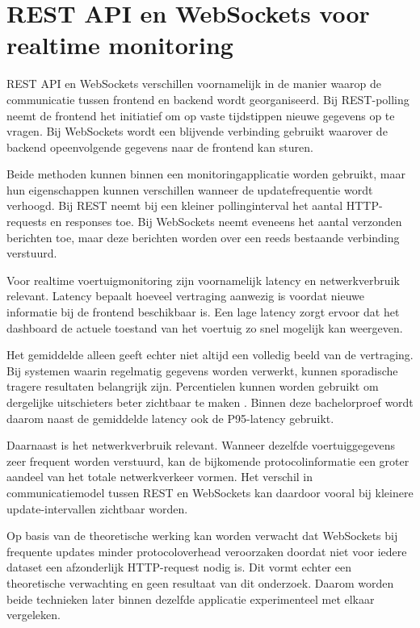 \section{REST API en WebSockets voor realtime monitoring}
REST API en WebSockets verschillen voornamelijk in de manier waarop de
communicatie tussen frontend en backend wordt georganiseerd. Bij REST-polling
neemt de frontend het initiatief om op vaste tijdstippen nieuwe gegevens op te
vragen. Bij WebSockets wordt een blijvende verbinding gebruikt waarover de
backend opeenvolgende gegevens naar de frontend kan sturen.

Beide methoden kunnen binnen een monitoringapplicatie worden gebruikt, maar hun
eigenschappen kunnen verschillen wanneer de updatefrequentie wordt verhoogd.
Bij REST neemt bij een kleiner pollinginterval het aantal HTTP-requests en
responses toe. Bij WebSockets neemt eveneens het aantal verzonden berichten
toe, maar deze berichten worden over een reeds bestaande verbinding
verstuurd.

Voor realtime voertuigmonitoring zijn voornamelijk latency en netwerkverbruik
relevant. Latency bepaalt hoeveel vertraging aanwezig is voordat nieuwe
informatie bij de frontend beschikbaar is. Een lage latency zorgt ervoor dat
het dashboard de actuele toestand van het voertuig zo snel mogelijk kan
weergeven.

Het gemiddelde alleen geeft echter niet altijd een volledig beeld van de
vertraging. Bij systemen waarin regelmatig gegevens worden verwerkt, kunnen
sporadische tragere resultaten belangrijk zijn. Percentielen kunnen worden
gebruikt om dergelijke uitschieters beter zichtbaar te maken
\autocite{Dean2013}. Binnen deze bachelorproef wordt daarom naast de gemiddelde
latency ook de P95-latency gebruikt.

Daarnaast is het netwerkverbruik relevant. Wanneer dezelfde voertuiggegevens
zeer frequent worden verstuurd, kan de bijkomende protocolinformatie een
groter aandeel van het totale netwerkverkeer vormen. Het verschil in
communicatiemodel tussen REST en WebSockets kan daardoor vooral bij kleinere
update-intervallen zichtbaar worden.

Op basis van de theoretische werking kan worden verwacht dat WebSockets bij
frequente updates minder protocoloverhead veroorzaken doordat niet voor iedere
dataset een afzonderlijk HTTP-request nodig is. Dit vormt echter een
theoretische verwachting en geen resultaat van dit onderzoek. Daarom worden
beide technieken later binnen dezelfde applicatie experimenteel met elkaar
vergeleken.

